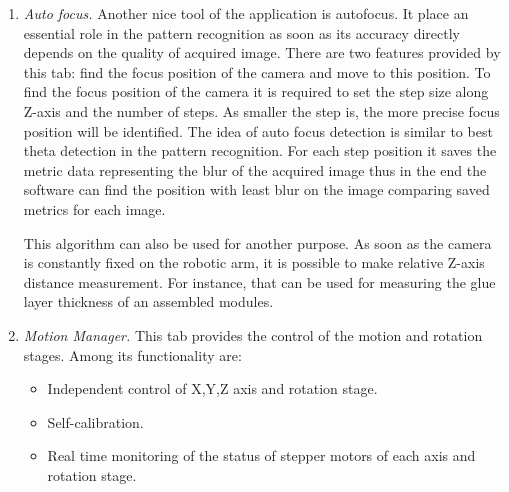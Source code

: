 \begin{enumerate}
\item \emph{Auto focus.} Another nice tool of the application is autofocus. It place an essential role in the pattern recognition as soon as its accuracy directly depends on the quality of acquired image. There are two features provided by this tab: find the focus position of the camera and move to this position. To find the focus position of the camera it is required to set the step size along Z-axis and the number of steps. As smaller the step is, the more precise focus position will be identified. The idea of auto focus detection is similar to best theta detection in the pattern recognition. For each step position it saves the metric data representing the blur of the acquired image thus in the end the software can find the position with least blur on the image comparing saved metrics for each image.

This algorithm can also be used for another purpose. As soon as the camera is constantly fixed on the robotic arm, it is possible to make relative Z-axis distance measurement. For instance, that can be used for measuring the glue layer thickness of an assembled modules.

\item \emph{Motion Manager.}
This tab provides the control of the motion and rotation stages. Among its functionality are:

\begin{itemize}
\setlength\itemsep{-0.5em}
\item Independent control of X,Y,Z axis and rotation stage.
\item Self-calibration.
\item Real time monitoring of the status of stepper motors of each axis and rotation stage.
\end{itemize}
\end{enumerate}


